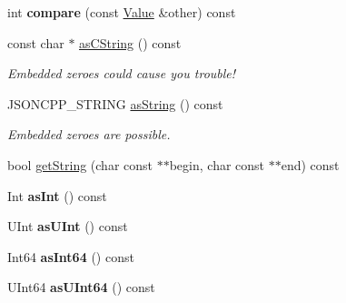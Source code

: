 \begin{DoxyCompactItemize}
\item 
int {\bfseries compare} (const \hyperlink{classJson_1_1Value}{Value} \&other) const\hypertarget{classJson_1_1Value_aefa4464ca1bb0bcc9a87b38ed62ca2e0}{}\label{classJson_1_1Value_aefa4464ca1bb0bcc9a87b38ed62ca2e0}

\item 
const char $\ast$ \hyperlink{classJson_1_1Value_a16668c8db7ef0a5de040012f0dfd84b0}{as\+C\+String} () const\hypertarget{classJson_1_1Value_a16668c8db7ef0a5de040012f0dfd84b0}{}\label{classJson_1_1Value_a16668c8db7ef0a5de040012f0dfd84b0}

\begin{DoxyCompactList}\small\item\em Embedded zeroes could cause you trouble! \end{DoxyCompactList}\item 
J\+S\+O\+N\+C\+P\+P\+\_\+\+S\+T\+R\+I\+NG \hyperlink{classJson_1_1Value_ae3f9b0d38f820ccdd8888aa92ea6e792}{as\+String} () const\hypertarget{classJson_1_1Value_ae3f9b0d38f820ccdd8888aa92ea6e792}{}\label{classJson_1_1Value_ae3f9b0d38f820ccdd8888aa92ea6e792}

\begin{DoxyCompactList}\small\item\em Embedded zeroes are possible. \end{DoxyCompactList}\item 
bool \hyperlink{classJson_1_1Value_a2e1b7be6bde2fe23f15290d9ddbbdf8a}{get\+String} (char const $\ast$$\ast$begin, char const $\ast$$\ast$end) const
\item 
Int {\bfseries as\+Int} () const\hypertarget{classJson_1_1Value_a614d635bc248a592593feb322cd15ab8}{}\label{classJson_1_1Value_a614d635bc248a592593feb322cd15ab8}

\item 
U\+Int {\bfseries as\+U\+Int} () const\hypertarget{classJson_1_1Value_a74b305583ec3aacf4f9dd06e799dc265}{}\label{classJson_1_1Value_a74b305583ec3aacf4f9dd06e799dc265}

\item 
Int64 {\bfseries as\+Int64} () const\hypertarget{classJson_1_1Value_af7371262e51d5c564908f5aa684516d1}{}\label{classJson_1_1Value_af7371262e51d5c564908f5aa684516d1}

\item 
U\+Int64 {\bfseries as\+U\+Int64} () const\hypertarget{classJson_1_1Value_aca53fe8b4bdd385010d431e5d01b3987}{}\label{classJson_1_1Value_aca53fe8b4bdd385010d431e5d01b3987}


\end{DoxyCompactItemize}
